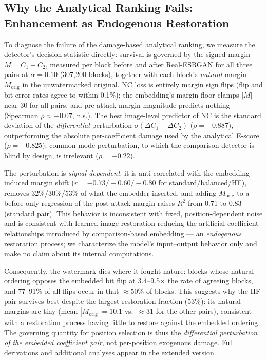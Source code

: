 \documentclass[conference]{IEEEtran}
\begin{document}
\subsection{Why the Analytical Ranking Fails: Enhancement as Endogenous
Restoration}
\label{sec:margin}

To diagnose the failure of the damage-based analytical ranking, we
measure the detector's decision statistic directly: survival is
governed by the signed margin $M = C_1 - C_2$, measured per block
before and after Real-ESRGAN for all three pairs at $\alpha = 0.10$
(307,200 blocks), together with each block's \emph{natural} margin
$M_{\mathrm{orig}}$ in the unwatermarked original. NC loss is entirely
margin sign flips (flip and bit-error rates agree to within 0.1\%);
the embedding's margin floor clamps $|M|$ near 30 for all pairs, and
pre-attack margin magnitude predicts nothing (Spearman
$\rho \approx -0.07$, n.s.). The best image-level predictor of NC is
the standard deviation of the \emph{differential} perturbation
$\sigma(\Delta C_1 - \Delta C_2)$ ($\rho = -0.887$), outperforming the
absolute per-coefficient damage used by the analytical E-score
($\rho = -0.825$); common-mode perturbation, to which the comparison
detector is blind by design, is irrelevant ($\rho = -0.22$).

The perturbation is \emph{signal-dependent}: it is anti-correlated
with the embedding-induced margin shift
($r = -0.73 / -0.60 / -0.80$ for standard/balanced/HF), removes
32\%/30\%/53\% of what the embedder inserted, and adding
$M_{\mathrm{orig}}$ to a before-only regression of the post-attack
margin raises $R^2$ from 0.71 to 0.83 (standard pair). This behavior
is inconsistent with fixed, position-dependent noise and is consistent
with learned image restoration reducing the artificial coefficient
relationships introduced by comparison-based embedding --- an
\emph{endogenous} restoration process; we characterize the model's
input--output behavior only and make no claim about its internal
computations.

Consequently, the watermark dies where it fought nature: blocks whose
natural ordering opposes the embedded bit flip at 3.4--9.5$\times$ the
rate of agreeing blocks, and 77--91\% of all flips occur in that
$\approx$50\% of blocks. This suggests why the HF pair survives best
despite the largest restoration fraction (53\%): its natural margins
are tiny (mean $|M_{\mathrm{orig}}| = 10.1$ vs.\ $\approx 31$ for the
other pairs), consistent with a restoration process having little to
restore against the embedded ordering. The governing quantity for
position selection is thus the \emph{differential perturbation of the
embedded coefficient pair}, not per-position exogenous damage. Full
derivations and additional analyses appear in the extended version.
\end{document}
